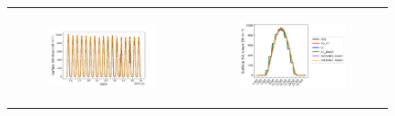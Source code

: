 \begin{figure}[hbtp]
\begin{tabular}{cc}
        \begin{subfigure}[t]{0.5\textwidth}
            \caption{}
            \includegraphics[width=\textwidth]{images/chap6/SOP_TS_DC/time_series_elsplans_SWdnSFC.png}
        \end{subfigure} &
        \begin{subfigure}[t]{0.5\textwidth}
            \caption{}
            \includegraphics[width=\textwidth]{images/chap6/SOP_TS_DC/diurnal_cycle_elsplans_SWdnSFC.png}
        \end{subfigure} \\
        

\end{tabular}
\end{figure}
